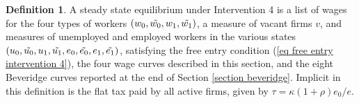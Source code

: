 \documentclass[12pt]{article} %
\theoremstyle{definition}
\newtheorem{definition}{Definition}%
\begin{document}
\begin{appendix}
\medskip

\begin{definition}\label{definition equilibrium}
	A steady state equilibrium under Intervention 4 is a list of wages for the four types of workers $(w_0, \Tilde{w_0}, w_1, \Tilde{w_1})$, a measure of vacant firms $v$, and measures of unemployed and employed workers in the various states $(u_0, \Tilde{u_0}, u_1, \Tilde{u_1}, e_0, \Tilde{e_0}, e_1, \Tilde{e_1})$, satisfying the free entry condition (\ref{eq free entry intervention 4}), the four wage curves described in this section, and the eight Beveridge curves reported at the end of Section \ref{section beveridge}. Implicit in this definition is the flat tax paid by all active firms, given by $\tau = \kappa(1+\rho)e_0/e$. 
\end{definition} 






\end{appendix}
\end{document}
